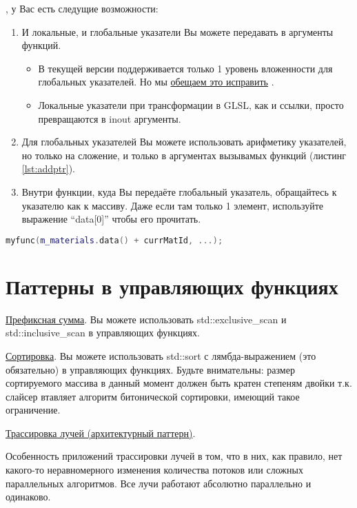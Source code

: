 \documentclass[11pt,fleqn,english,russian]{report} %
\begin{document}
, у Вас есть следущие возможности:

\begin{enumerate}
\item И локальные, и глобальные указатели Вы можете передавать в аргументы функций. 
\begin{itemize}
\item В текущей версии поддерживается только 1 уровень вложенности для глобальных указателей. Но мы \href{https://github.com/Ray-Tracing-Systems/kernel_slicer/issues/16}{обещаем это исправить} \cite{issue16}.
\item Локальные указатели при трансформации в GLSL, как и ссылки, просто превращаются в inout аргументы.
\end{itemize}	
\item Для глобальных указателей Вы можете использовать арифметику указателей, но только на сложение, и только в аргументах вызывамых функций (листинг \ref{lst:addptr}).
\item Внутри функции, куда Вы передаёте глобальный указатель, обращайтесь к указателю как к массиву. Даже если там только 1 элемент, используйте выражение ``data[0]'' чтобы его прочитать. 
\end{enumerate}

\begin{lstlisting}[language=C++, 
	caption=ограниченная поддержка арифметики указателей, 
	label=lst:addptr]
  myfunc(m_materials.data() + currMatId, ...);
\end{lstlisting}

\section{Паттерны в управляющих функциях}

\noindent\underline{Префиксная сумма}. Вы можете использовать std::exclusive\_scan и std::inclusive\_scan в управляющих функциях.

\noindent\underline{Сортировка}. Вы можете использовать std::sort с лямбда-выражением (это обязательно) в управляющих функциях. Будьте внимательны: размер сортируемого массива в данный момент должен быть кратен степеням двойки т.к. слайсер втавляет алгоритм битонической сортировки, имеющий такое ограничение.

\noindent\underline{Трассировка лучей (архитектурный паттерн)}.

Особенность приложений трассировки лучей в том, что в них, как правило, нет какого-то неравномерного изменения количества потоков или сложных параллельных алгоритмов. Все лучи работают абсолютно параллельно и одинаково.
\end{document}
